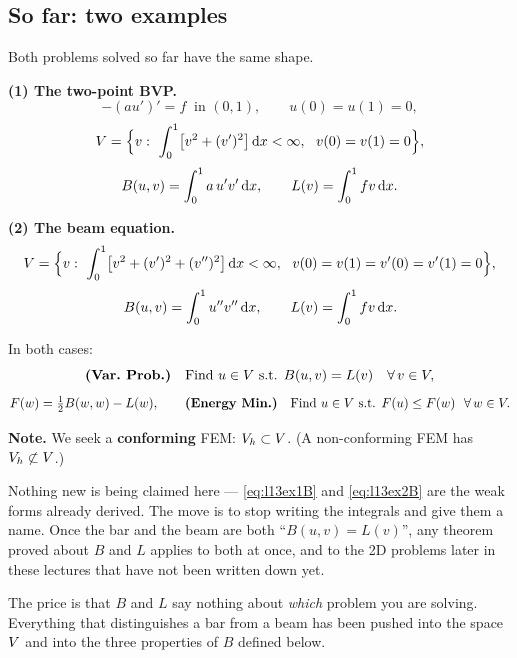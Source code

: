\subsection*{So far: two examples}

Both problems solved so far have the same shape.

\medskip\noindent
\textbf{(1) The two-point BVP.}
\begin{equation}\label{eq:l13ex1}
  -(au')'=f \ \text{ in } (0,1),\qquad u(0)=u(1)=0,
\end{equation}
\begin{equation}\label{eq:l13ex1V}
  \Vsp=\Bigl\{v:\ \int_0^1\bigl[v^{2}+(v')^{2}\bigr]\dx<\infty,\ \ v(0)=v(1)=0\Bigr\},
\end{equation}
\begin{equation}\label{eq:l13ex1B}
  B(u,v)=\int_0^1 a\,u'v'\,\mathrm{d} x,\qquad L(v)=\int_0^1 f v\,\mathrm{d} x .
\end{equation}

\noindent
\textbf{(2) The beam equation.}
\begin{equation}\label{eq:l13ex2V}
  \Vsp=\Bigl\{v:\ \int_0^1\bigl[v^{2}+(v')^{2}+(v'')^{2}\bigr]\dx<\infty,\ \
  v(0)=v(1)=v'(0)=v'(1)=0\Bigr\},
\end{equation}
\begin{equation}\label{eq:l13ex2B}
  B(u,v)=\int_0^1 u''v''\,\mathrm{d} x,\qquad L(v)=\int_0^1 f v\,\mathrm{d} x .
\end{equation}

\noindent
In both cases:
\begin{equation}\label{eq:l13absvar}
  \textbf{(Var.\ Prob.)}\quad\text{Find } u\in V \text{ s.t. }
  B(u,v)=L(v)\quad\forall\,v\in V ,
\end{equation}
\begin{equation}\label{eq:l13absmin}
  F(w)=\tfrac12 B(w,w)-L(w),\qquad
  \textbf{(Energy Min.)}\quad\text{Find } u\in V \text{ s.t. }
  F(u)\le F(w)\ \ \forall\,w\in V .
\end{equation}

\medskip\noindent
\textbf{Note.} We seek a \textbf{conforming} FEM: $V_{h}\subset V$.
(A non-conforming FEM has $V_{h}\not\subset V$.)

\begin{intuition}
Nothing new is being claimed here --- \eqref{eq:l13ex1B} and
\eqref{eq:l13ex2B} are the weak forms already derived. The move is to stop
writing the integrals and give them a name. Once the bar and the beam are both
``$B(u,v)=L(v)$'', any theorem proved about $B$ and $L$ applies to both at
once, and to the 2D problems later in these lectures that have not been written
down yet.

The price is that $B$ and $L$ say nothing about \emph{which} problem you are
solving. Everything that distinguishes a bar from a beam has been pushed into
the space $V$ and into the three properties of $B$ defined below.
\end{intuition}

